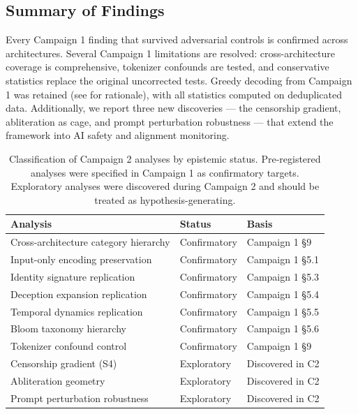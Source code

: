 \documentclass[11pt,a4paper]{article}
\begin{document}
\subsection{Summary of Findings}

Every Campaign 1 finding that survived adversarial controls is confirmed across architectures. Several Campaign 1 limitations are resolved: cross-architecture coverage is comprehensive, tokenizer confounds are tested, and conservative statistics replace the original uncorrected tests. Greedy decoding from Campaign 1 was retained (see  for rationale), with all statistics computed on deduplicated data. Additionally, we report three new discoveries --- the censorship gradient, abliteration as cage, and prompt perturbation robustness --- that extend the framework into AI safety and alignment monitoring.

\begin{table}[H]
\centering
\caption{Classification of Campaign 2 analyses by epistemic status. Pre-registered analyses were specified in Campaign 1 as confirmatory targets. Exploratory analyses were discovered during Campaign 2 and should be treated as hypothesis-generating.}
\label{tab:epistemic_status}
\begin{tabular}{lll}
\toprule
\textbf{Analysis} & \textbf{Status} & \textbf{Basis} \\
\midrule
Cross-architecture category hierarchy & Confirmatory & Campaign 1 \S9 \\
Input-only encoding preservation & Confirmatory & Campaign 1 \S5.1 \\
Identity signature replication & Confirmatory & Campaign 1 \S5.3 \\
Deception expansion replication & Confirmatory & Campaign 1 \S5.4 \\
Temporal dynamics replication & Confirmatory & Campaign 1 \S5.5 \\
Bloom taxonomy hierarchy & Confirmatory & Campaign 1 \S5.6 \\
Tokenizer confound control & Confirmatory & Campaign 1 \S9 \\
\midrule
Censorship gradient (S4) & Exploratory & Discovered in C2 \\
Abliteration geometry & Exploratory & Discovered in C2 \\
Prompt perturbation robustness & Exploratory & Discovered in C2 \\
\bottomrule
\end{tabular}
\end{table}
\end{document}
